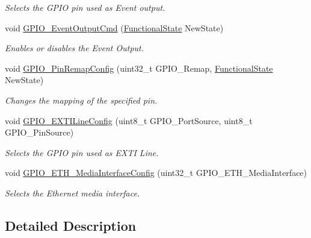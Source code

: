 \begin{DoxyCompactItemize}
\begin{DoxyCompactList}\small\item\em Selects the G\+P\+IO pin used as Event output. \end{DoxyCompactList}\item 
void \mbox{\hyperlink{group___g_p_i_o___private___functions_gaf13ab3d59e467df44b492f1cdfe2f588}{G\+P\+I\+O\+\_\+\+Event\+Output\+Cmd}} (\mbox{\hyperlink{group___exported__types_gac9a7e9a35d2513ec15c3b537aaa4fba1}{Functional\+State}} New\+State)
\begin{DoxyCompactList}\small\item\em Enables or disables the Event Output. \end{DoxyCompactList}\item 
void \mbox{\hyperlink{group___g_p_i_o___private___functions_ga64eb76f6211b840daf9829289df4208b}{G\+P\+I\+O\+\_\+\+Pin\+Remap\+Config}} (uint32\+\_\+t G\+P\+I\+O\+\_\+\+Remap, \mbox{\hyperlink{group___exported__types_gac9a7e9a35d2513ec15c3b537aaa4fba1}{Functional\+State}} New\+State)
\begin{DoxyCompactList}\small\item\em Changes the mapping of the specified pin. \end{DoxyCompactList}\item 
void \mbox{\hyperlink{group___g_p_i_o___private___functions_ga8c1f13646d7418827378032a584da653}{G\+P\+I\+O\+\_\+\+E\+X\+T\+I\+Line\+Config}} (uint8\+\_\+t G\+P\+I\+O\+\_\+\+Port\+Source, uint8\+\_\+t G\+P\+I\+O\+\_\+\+Pin\+Source)
\begin{DoxyCompactList}\small\item\em Selects the G\+P\+IO pin used as E\+X\+TI Line. \end{DoxyCompactList}\item 
void \mbox{\hyperlink{group___g_p_i_o___private___functions_gacbfad958f684347be0f2c762dc85c3c2}{G\+P\+I\+O\+\_\+\+E\+T\+H\+\_\+\+Media\+Interface\+Config}} (uint32\+\_\+t G\+P\+I\+O\+\_\+\+E\+T\+H\+\_\+\+Media\+Interface)
\begin{DoxyCompactList}\small\item\em Selects the Ethernet media interface. \end{DoxyCompactList}\end{DoxyCompactItemize}


\subsection{Detailed Description}


